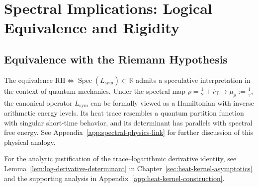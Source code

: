 \section{Spectral Implications: Logical Equivalence and Rigidity}
\label{sec:spectral_implications}



\subsection{Equivalence with the Riemann Hypothesis}













\begin{remark}
The equivalence \( \mathrm{RH} \iff \operatorname{Spec}(L_{\mathrm{sym}}) \subset \mathbb{R} \) admits a speculative interpretation in the context of quantum mechanics. Under the spectral map \( \rho = \tfrac{1}{2} + i\gamma \mapsto \mu_\rho := \tfrac{1}{\gamma} \), the canonical operator \( L_{\mathrm{sym}} \) can be formally viewed as a Hamiltonian with inverse arithmetic energy levels. Its heat trace resembles a quantum partition function with singular short-time behavior, and its determinant has parallels with spectral free energy. See Appendix~\ref{app:spectral-physics-link} for further discussion of this physical analogy.
\end{remark}

\medskip
\noindent
For the analytic justification of the trace–logarithmic derivative identity, see Lemma~\ref{lem:log-derivative-determinant} in Chapter~\ref{sec:heat-kernel-asymptotics} and the supporting analysis in Appendix~\ref{app:heat-kernel-construction}.


